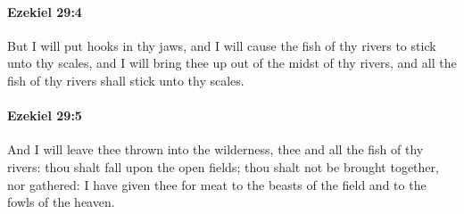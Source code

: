 		\paragraph{Ezekiel 29:4} %
			\label{EZEKIEL-29-4}

			But I will put hooks in thy jaws, and I will cause the fish of thy rivers to stick unto thy scales, and I will bring thee up out of the midst of thy rivers, and all the fish of thy rivers shall stick unto thy scales.


		\paragraph{Ezekiel 29:5} %
			\label{EZEKIEL-29-5}

			And I will leave thee thrown into the wilderness, thee and all the fish of thy rivers: thou shalt fall upon the open fields; thou shalt not be brought together, nor gathered: I have given thee for meat to the beasts of the field and to the fowls of the heaven.

